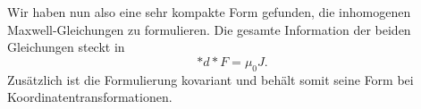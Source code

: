 Wir haben nun also eine sehr kompakte Form gefunden, die inhomogenen Maxwell-Gleichungen zu formulieren.
Die gesamte Information der beiden Gleichungen steckt in
\begin{equation}
	\ast d \ast F = \mu_0 J.
\end{equation}
Zusätzlich ist die Formulierung kovariant und behält somit seine Form bei Koordinatentransformationen.
\begin{comment}
Damit wir nun den erhaltenen Ausdruck auch interpretieren können definieren wir die Viererstromdichte als
\begin{equation}
	J = -c\rho dx^0 + J_1 dx^1 + J_2 dx^2 +J_3 dx^3.
\end{equation}
Schreiben wir auch diese 1-Form in physikalisch sinnvollen Einheiten erhalten wir 
\begin{equation}
	J = -c^2\rho dt + J_1 dx + J_2 dy + J_3 dz.
\end{equation}
Multiplizieren wir zu $J$ noch ein $\mu_0$ erhalten wir den Ausdruck
\begin{equation}
	\mu_0 J = -\frac{\rho}{\varepsilon_0}dt + \mu_0 (J_1 dx +  J_2 dy +  J_3 dz),
\end{equation}
weil im Vakuum $c = \frac{1}{\sqrt{\varepsilon_0 \mu_0}}$ gilt. Setzen wir nun die beiden Teile der Gleichung zusammen ergibt sich
\begin{equation}
	\ast d \ast F = \mu_0 J.
\end{equation}
Jetzt können wir die einzelnen Teile vergleichen und wissen bereits, dass es sich um vier unabhängige Gleichungen handeln muss, nämlich eine für jede Basis-1-Form.

Betrachten wir nur die Koeffizienten der Zeitkomponente $dt$, resultiert die Gleichung
\begin{equation}
	\frac{\partial E_1}{\partial x} +\frac{\partial E_2}{\partial y} + \frac{\partial E_3}{\partial z} = \frac{\rho}{\varepsilon_0},
\end{equation}
(Frage: hier die $dt$ auf beiden Seiten der Gleichung explizit hinschreiben damit klar ist, dass es sich um eine 1-Form handelt oder ist das egal?)

welche als das Gausssche Gesetz der Elektrostatik bekannt ist.
diese Gleichung lässt sich, sofern man eine kartesische Raumstruktur wählt, in die klassische Vektorform
\begin{equation}
	\nabla \cdot \vec{E} = \frac{\rho}{\varepsilon_0}
\end{equation}
umschreiben.


\end{comment}
